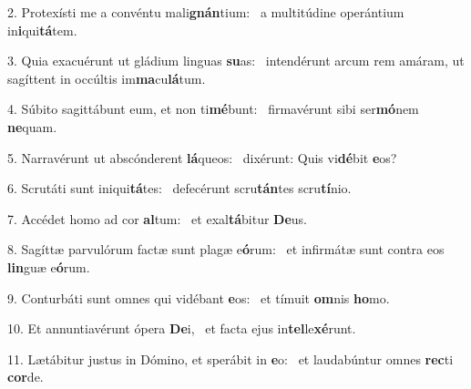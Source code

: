 2. Protexísti me a convéntu mali\textbf{gnán}tium: \ast\  a multitúdine operántium in\textbf{i}qui\textbf{tá}tem.\

3. Quia exacuérunt ut gládium linguas \textbf{su}as: \ast\  intendérunt arcum rem amáram, ut sagíttent in occúltis im\textbf{ma}cu\textbf{lá}tum.\

4. Súbito sagittábunt eum, et non ti\textbf{mé}bunt: \ast\  firmavérunt sibi ser\textbf{mó}nem \textbf{ne}quam.\

5. Narravérunt ut abscónderent \textbf{lá}queos: \ast\  dixérunt: Quis vi\textbf{dé}bit \textbf{e}os?\

6. Scrutáti sunt iniqui\textbf{tá}tes: \ast\  defecérunt scru\textbf{tán}tes scru\textbf{tí}nio.\

7. Accédet homo ad cor \textbf{al}tum: \ast\  et exal\textbf{tá}bitur \textbf{De}us.\

8. Sagíttæ parvulórum factæ sunt plagæ e\textbf{ó}rum: \ast\  et infirmátæ sunt contra eos \textbf{lin}guæ e\textbf{ó}rum.\

9. Conturbáti sunt omnes qui vidébant \textbf{e}os: \ast\  et tímuit \textbf{om}nis \textbf{ho}mo.\

10. Et annuntiavérunt ópera \textbf{De}i, \ast\  et facta ejus in\textbf{tel}le\textbf{xé}runt.\

11. Lætábitur justus in Dómino, et sperábit in \textbf{e}o: \ast\  et laudabúntur omnes \textbf{rec}ti \textbf{cor}de.\

